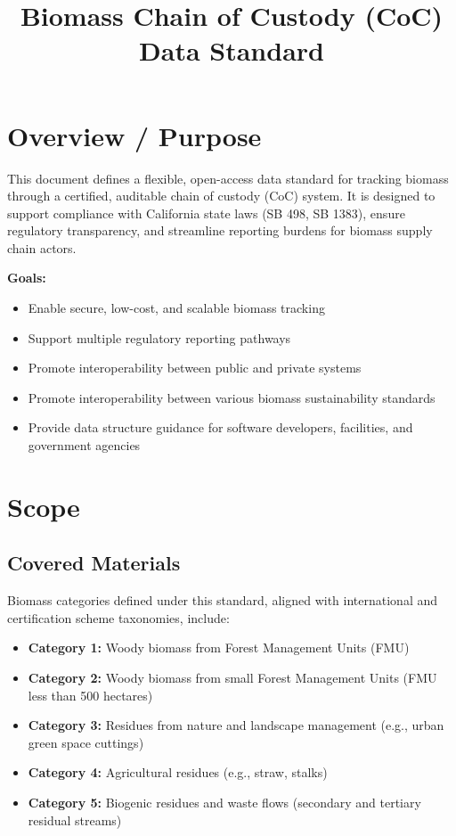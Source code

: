 \documentclass{article}
\title{Biomass Chain of Custody (CoC) Data Standard}
\date{}
\begin{document}
\maketitle

\section{Overview / Purpose}
This document defines a flexible, open-access data standard for tracking biomass through a certified, auditable chain of custody (CoC) system. It is designed to support compliance with California state laws (SB 498, SB 1383), ensure regulatory transparency, and streamline reporting burdens for biomass supply chain actors.

\textbf{Goals:}
\begin{itemize}[noitemsep]
    \item Enable secure, low-cost, and scalable biomass tracking
    \item Support multiple regulatory reporting pathways
    \item Promote interoperability between public and private systems
    \item Promote interoperability between various biomass sustainability standards
    \item Provide data structure guidance for software developers, facilities, and government agencies
\end{itemize}

\section{Scope}
\subsection*{Covered Materials}
Biomass categories defined under this standard, aligned with international and certification scheme taxonomies, include:
\begin{itemize}[noitemsep]
    \item \textbf{Category 1:} Woody biomass from Forest Management Units (FMU)
    \item \textbf{Category 2:} Woody biomass from small Forest Management Units (FMU less than 500 hectares)
    \item \textbf{Category 3:} Residues from nature and landscape management (e.g., urban green space cuttings)
    \item \textbf{Category 4:} Agricultural residues (e.g., straw, stalks)
    \item \textbf{Category 5:} Biogenic residues and waste flows (secondary and tertiary residual streams)
\end{itemize}
\end{document}
